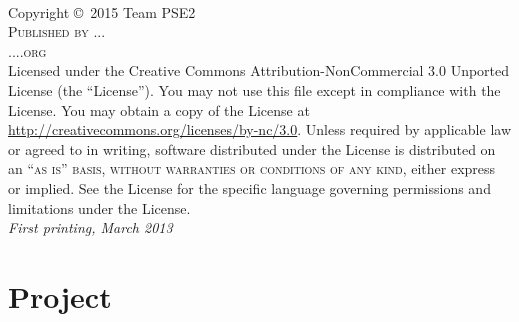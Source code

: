 \documentclass[11pt,fleqn,openany]{book} %
\begin{document}

\newpage
~\vfill
\thispagestyle{empty}

\noindent Copyright \copyright\ 2015 Team PSE2\\ %

\noindent \textsc{Published by ...}\\ %

\noindent \textsc{....org}\\ %

\noindent Licensed under the Creative Commons Attribution-NonCommercial 3.0 Unported License (the ``License''). You may not use this file except in compliance with the License. You may obtain a copy of the License at \url{http://creativecommons.org/licenses/by-nc/3.0}. Unless required by applicable law or agreed to in writing, software distributed under the License is distributed on an \textsc{``as is'' basis, without warranties or conditions of any kind}, either express or implied. See the License for the specific language governing permissions and limitations under the License.\\ %

\noindent \textit{First printing, March 2013} %



\pagestyle{empty} %

\tableofcontents %

\cleardoublepage %

\pagestyle{fancy} %


\part{Project}
\end{document}
